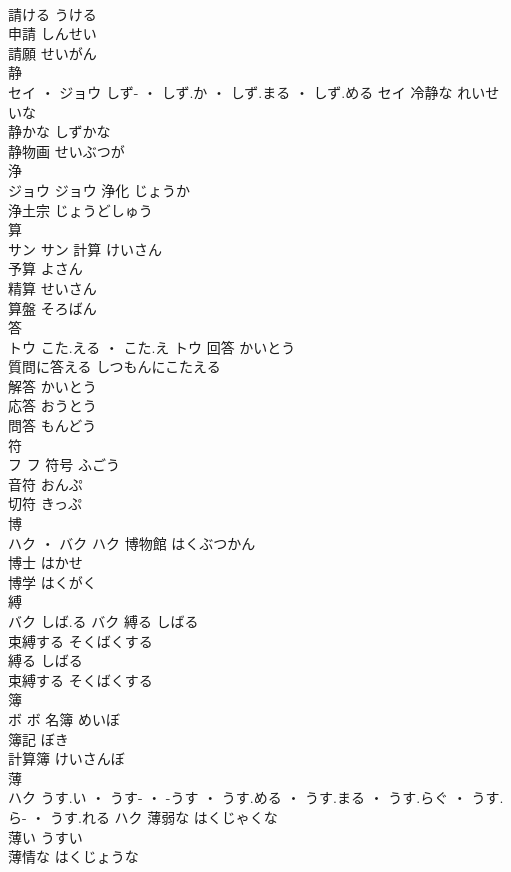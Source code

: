 \documentclass[8pt]{extreport}
\begin{document}
\begin{CJK}{UTF8}{min}
\\	請ける	うける	
\\	申請	しんせい	
\\	請願	せいがん	
\\	静	
\\	セイ ・ ジョウ	しず- ・ しず.か ・ しず.まる ・ しず.める	セイ	冷静な	れいせいな	
\\	静かな	しずかな	
\\	静物画	せいぶつが	
\\	浄	
\\	ジョウ		ジョウ	浄化	じょうか	
\\	浄土宗	じょうどしゅう	
\\	算	
\\	サン		サン	計算	けいさん	
\\	予算	よさん	
\\	精算	せいさん	
\\	算盤	そろばん	
\\	答	
\\	トウ	こた.える ・ こた.え	トウ	回答	かいとう	
\\	質問に答える	しつもんにこたえる	
\\	解答	かいとう	
\\	応答	おうとう	
\\	問答	もんどう	
\\	符	
\\	フ		フ	符号	ふごう	
\\	音符	おんぷ	
\\	切符	きっぷ	
\\	博	
\\	ハク ・ バク		ハク	博物館	はくぶつかん	
\\	博士	はかせ	
\\	博学	はくがく	
\\	縛	
\\	バク	しば.る	バク	縛る	しばる	
\\	束縛する	そくばくする	
\\	縛る	しばる	
\\	束縛する	そくばくする	
\\	簿	
\\	ボ		ボ	名簿	めいぼ	
\\	簿記	ぼき	
\\	計算簿	けいさんぼ	
\\	薄	
\\	ハク	うす.い ・ うす- ・ -うす ・ うす.める ・ うす.まる ・ うす.らぐ ・ うす.ら- ・ うす.れる	ハク	薄弱な	はくじゃくな	
\\	薄い	うすい	
\\	薄情な	はくじょうな	

\end{CJK}
\end{document}
